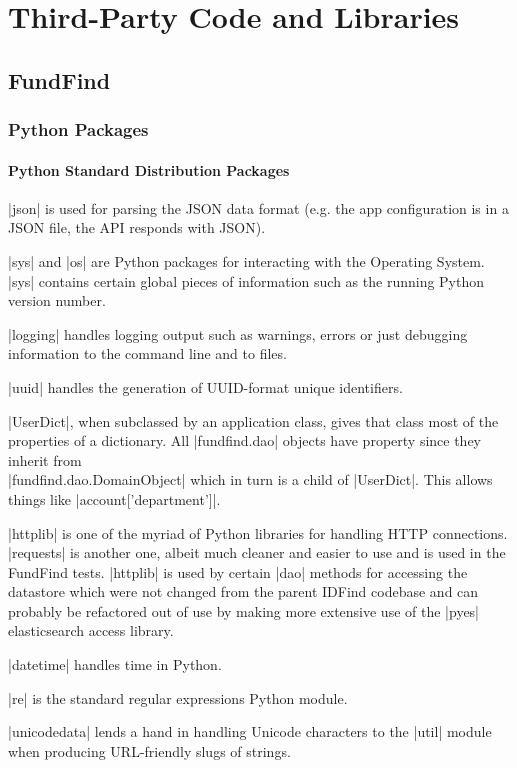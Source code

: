 \chapter{Third-Party Code and Libraries}
\label{third-party}

\section{FundFind}
\subsection{Python Packages}
\subsubsection{Python Standard Distribution Packages}
|json| is used for parsing the JSON data format (e.g. the app configuration is in a JSON file, the API responds with JSON).

|sys| and |os| are Python packages for interacting with the Operating System. |sys| contains certain global pieces of information such as the running Python version number.

|logging| handles logging output such as warnings, errors or just debugging information to the command line and to files.

|uuid| handles the generation of UUID-format unique identifiers.

|UserDict|, when subclassed by an application class, gives that class most of the properties of a dictionary. All |fundfind.dao| objects have property since they inherit from 
\\|fundfind.dao.DomainObject| which in turn is a child of |UserDict|. This allows things like |account['department']|.

|httplib| is one of the myriad of Python libraries for handling HTTP connections. |requests| is another one, albeit much cleaner and easier to use and is used in the FundFind tests. |httplib| is used by certain |dao| methods for accessing the datastore which were not changed from the parent IDFind codebase and can probably be refactored out of use by making more extensive use of the |pyes| elasticsearch access library.

|datetime| handles time in Python.

|re| is the standard regular expressions Python module.

|unicodedata| lends a hand in handling Unicode characters to the |util| module when producing URL-friendly slugs of strings.

